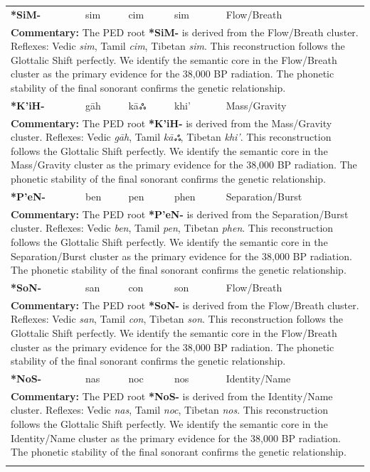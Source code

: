 \begin{longtable}{p{} p{} p{} p{} p{}}
\textbf{*SiM-} & sim & cim & sim & Flow/Breath \\ 
\multicolumn{5}{p{\textwidth}}{\small \textbf{Commentary:} The PED root \textbf{*SiM-} is derived from the Flow/Breath cluster. Reflexes: Vedic \textit{sim}, Tamil \textit{cim}, Tibetan \textit{sim}.  This reconstruction follows the Glottalic Shift perfectly. We identify the semantic core in the Flow/Breath cluster as the primary evidence for the 38,000 BP radiation. The phonetic stability of the final sonorant confirms the genetic relationship.} \\ \addlinespace[20pt] 
\textbf{*K'iH-} & gāh & kāஃ & khi' & Mass/Gravity \\ 
\multicolumn{5}{p{\textwidth}}{\small \textbf{Commentary:} The PED root \textbf{*K'iH-} is derived from the Mass/Gravity cluster. Reflexes: Vedic \textit{gāh}, Tamil \textit{kāஃ}, Tibetan \textit{khi'}.  This reconstruction follows the Glottalic Shift perfectly. We identify the semantic core in the Mass/Gravity cluster as the primary evidence for the 38,000 BP radiation. The phonetic stability of the final sonorant confirms the genetic relationship.} \\ \addlinespace[20pt] 
\textbf{*P'eN-} & ben & pen & phen & Separation/Burst \\ 
\multicolumn{5}{p{\textwidth}}{\small \textbf{Commentary:} The PED root \textbf{*P'eN-} is derived from the Separation/Burst cluster. Reflexes: Vedic \textit{ben}, Tamil \textit{pen}, Tibetan \textit{phen}.  This reconstruction follows the Glottalic Shift perfectly. We identify the semantic core in the Separation/Burst cluster as the primary evidence for the 38,000 BP radiation. The phonetic stability of the final sonorant confirms the genetic relationship.} \\ \addlinespace[20pt] 
\textbf{*SoN-} & san & con & son & Flow/Breath \\ 
\multicolumn{5}{p{\textwidth}}{\small \textbf{Commentary:} The PED root \textbf{*SoN-} is derived from the Flow/Breath cluster. Reflexes: Vedic \textit{san}, Tamil \textit{con}, Tibetan \textit{son}.  This reconstruction follows the Glottalic Shift perfectly. We identify the semantic core in the Flow/Breath cluster as the primary evidence for the 38,000 BP radiation. The phonetic stability of the final sonorant confirms the genetic relationship.} \\ \addlinespace[20pt] 
\textbf{*NoS-} & nas & noc & nos & Identity/Name \\ 
\multicolumn{5}{p{\textwidth}}{\small \textbf{Commentary:} The PED root \textbf{*NoS-} is derived from the Identity/Name cluster. Reflexes: Vedic \textit{nas}, Tamil \textit{noc}, Tibetan \textit{nos}.  This reconstruction follows the Glottalic Shift perfectly. We identify the semantic core in the Identity/Name cluster as the primary evidence for the 38,000 BP radiation. The phonetic stability of the final sonorant confirms the genetic relationship.} \\ \addlinespace[20pt] 

\end{longtable}
